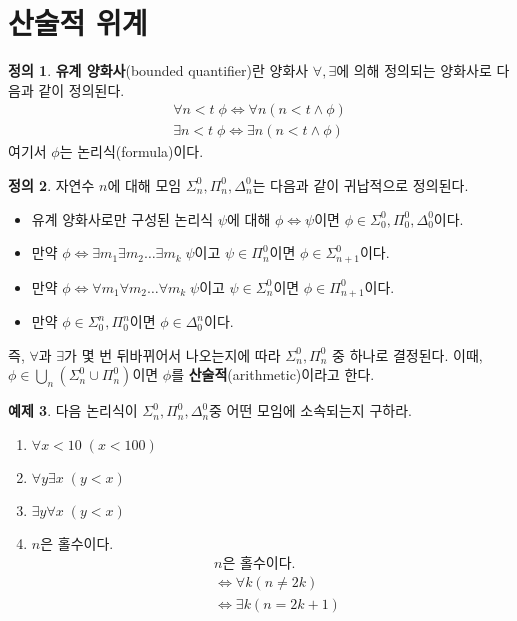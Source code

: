 \documentclass[b5paper, 11pt]{book}
\theoremstyle{definition}
\newtheorem{defn}{정의}[chapter]
\newtheorem{ex}[defn]{예제}
\begin{document}
\section{산술적 위계}
\begin{defn}
    \textbf{유계 양화사}(bounded quantifier)란 양화사 $\forall, \exists$에 의해
    정의되는 양화사로 다음과 같이 정의된다. 
    \begin{align*}
        \forall n < t \; \phi \Leftrightarrow \forall n (n < t \wedge \phi) \\
        \exists n < t \; \phi \Leftrightarrow \exists n (n < t \wedge \phi)
    \end{align*}
    여기서 $\phi$는 논리식(formula)이다. 
\end{defn}
\begin{defn}
    자연수 $n$에 대해 모임 $\Sigma_n^0, \Pi_n^0, \Delta_n^0$는 다음과 같이 귀납적으로 정의된다.
    \begin{itemize}
        \item 유계 양화사로만 구성된 논리식 $\psi$에 대해 $\phi \Leftrightarrow \psi$이면 $\phi \in 
        \Sigma_0^0, \Pi_0^0, \Delta_0^0$이다. 
        \item 만약 $\phi \Leftrightarrow \exists m_1 \exists m_2 \ldots \exists m_k \; \psi$이고
        $\psi \in \Pi_n^0$이면 $\phi \in \Sigma_{n+1}^0$이다.  
        \item 만약 $\phi \Leftrightarrow \forall m_1 \forall m_2 \ldots \forall m_k \; \psi$이고
        $\psi \in \Sigma_n^0$이면 $\phi \in \Pi_{n+1}^0$이다.  
        \item 만약 $\phi \in \Sigma_0^n, \Pi_0^n$이면 $\phi \in \Delta_0^n$이다.
    \end{itemize}
    즉, $\forall $과 $\exists$가 몇 번 뒤바뀌어서 나오는지에 따라 $\Sigma_n^0, \Pi_n^0$ 중 하나로
    결정된다. 이때, $\phi \in \bigcup_n (\Sigma_n^0 \cup \Pi_n^0 )$이면 $\phi$를 \textbf{산술적}(arithmetic)이라고
    한다.
\end{defn}
\begin{ex}
    다음 논리식이 $\Sigma_n^0, \Pi_n^0, \Delta_n^0$중 어떤 모임에 소속되는지 구하라.
    \begin{enumerate}
        \item $\forall x < 10 \; (x < 100)$ 
        \item $\forall y \exists x \; (y < x)$
        \item $\exists y \forall x \; (y < x)$
        \item $n$은 홀수이다.
        \begin{align*}
            &n\text{은 홀수이다.} \\ 
            &\Leftrightarrow \forall k (n \neq 2k) \\ 
            &\Leftrightarrow \exists k (n = 2k + 1)
        \end{align*}
    \end{enumerate}
\end{ex}
\end{document}
